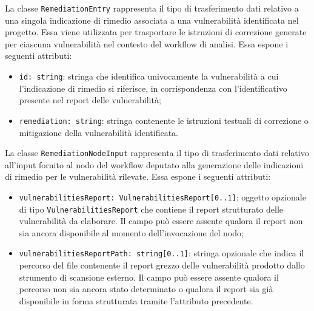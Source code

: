 \documentclass[a4paper, 11pt]{article}
\newcounter{subsubsubsection}[subsubsection]
\begin{document}
\label{sec:RemediationEntry}
 
La classe \texttt{RemediationEntry} rappresenta il tipo di trasferimento dati relativo a una
singola indicazione di rimedio associata a una vulnerabilità identificata nel progetto. Essa viene
utilizzata per trasportare le istruzioni di correzione generate per ciascuna vulnerabilità nel
contesto del workflow di analisi. Essa espone i seguenti attributi:
 
\begin{itemize}
  \item \texttt{id: string}: stringa che identifica univocamente la vulnerabilità a cui
    l'indicazione di rimedio si riferisce, in corrispondenza con l'identificativo presente nel
    report delle vulnerabilità;
 
  \item \texttt{remediation: string}: stringa contenente le istruzioni testuali di correzione o
    mitigazione della vulnerabilità identificata.
\end{itemize}
 
\label{sec:RemediationNodeInput}
 
La classe \texttt{RemediationNodeInput} rappresenta il tipo di trasferimento dati relativo
all'input fornito al nodo del workflow deputato alla generazione delle indicazioni di rimedio per
le vulnerabilità rilevate. Essa espone i seguenti attributi:
 
\begin{itemize}
  \item \texttt{vulnerabilitiesReport: VulnerabilitiesReport[0..1]}: oggetto opzionale di tipo \newline
    \texttt{VulnerabilitiesReport} che contiene il report strutturato delle vulnerabilità da
    elaborare. Il campo può essere assente qualora il report non sia ancora disponibile al momento
    dell'invocazione del nodo;
 
  \item \texttt{vulnerabilitiesReportPath: string[0..1]}: stringa opzionale che indica il percorso
    del file contenente il report grezzo delle vulnerabilità prodotto dallo strumento di scansione
    esterno. Il campo può essere assente qualora il percorso non sia ancora stato determinato o
    qualora il report sia già disponibile in forma strutturata tramite l'attributo precedente.
\end{itemize}
\end{document}
